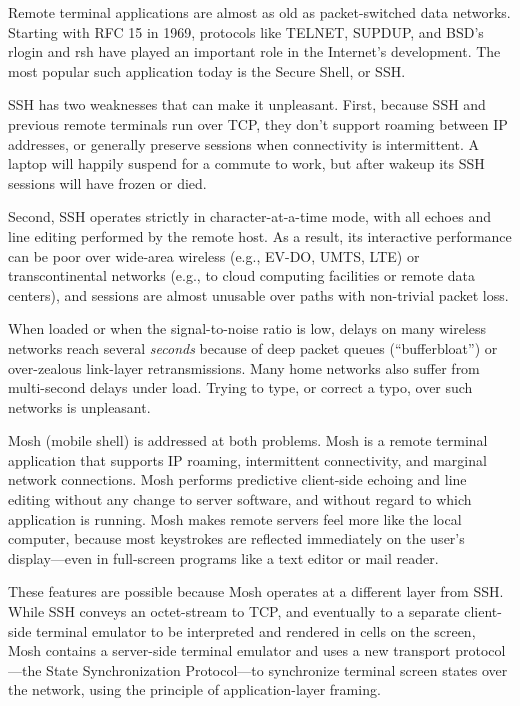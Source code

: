 \documentclass{article}
\begin{document}
\vspace{\baselineskip}

Remote terminal applications are almost as old as packet-switched data
networks. Starting with RFC 15 in 1969, protocols like TELNET, SUPDUP,
and BSD's rlogin and rsh have played an important role in the
Internet's development. The most popular such application today is the
Secure Shell, or SSH.

SSH has two weaknesses that can make it unpleasant. First, because SSH
and previous remote terminals run over TCP, they don't support roaming
between IP addresses, or generally preserve sessions when connectivity is
intermittent.
A laptop will happily suspend for a commute to work, but after wakeup
its SSH sessions will have frozen or died.

Second, SSH operates strictly in character-at-a-time mode, with all
echoes and line editing performed by the remote host.  As a result,
its interactive performance can be poor over wide-area wireless (e.g.,
EV-DO, UMTS, LTE) or transcontinental networks (e.g., to cloud
computing facilities or remote data centers), and sessions are almost
unusable over
paths with non-trivial packet loss.  

When loaded or when the signal-to-noise ratio is low, delays on many
wireless networks reach several \textit{seconds} because of deep
packet queues (``bufferbloat'') or over-zealous link-layer
retransmissions. Many home networks also suffer from
multi-second delays under load. Trying to type, or correct a typo,
over such networks is unpleasant.

Mosh (mobile shell) is addressed at both problems. Mosh is a
remote terminal application that supports IP roaming, intermittent
connectivity, and marginal network connections. Mosh performs
predictive client-side echoing and line editing without any change to
server software, and without regard to which application is running.
Mosh makes remote servers feel more like the local computer, because
most keystrokes are reflected immediately on the user's display---even
in full-screen programs like a text editor or mail reader.

These features are possible because Mosh operates at a different layer
from SSH\@. While SSH conveys an octet-stream to TCP, and eventually
to a separate client-side terminal emulator to be interpreted and
rendered in cells on the screen, Mosh contains a server-side terminal
emulator and uses a new transport protocol---the State Synchronization
Protocol---to synchronize terminal screen states over the network,
using the principle of application-layer framing.
\end{document}
